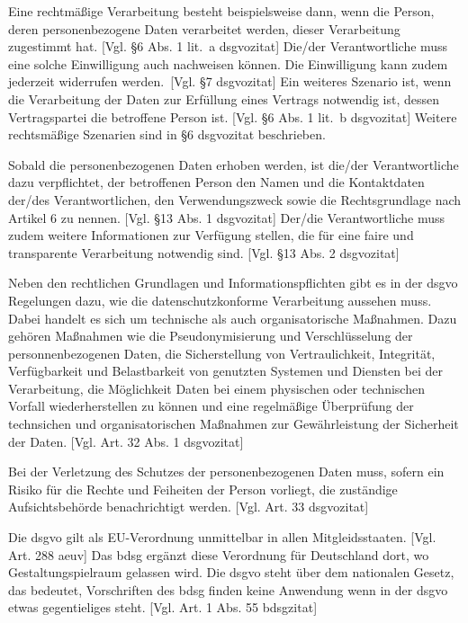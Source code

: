 Eine rechtmäßige Verarbeitung besteht beispielsweise dann, wenn die Person, deren personenbezogene Daten verarbeitet werden, dieser Verarbeitung zugestimmt hat. [Vgl. §6 Abs. 1 lit.~a \gls{dsgvozitat}] Die/der Verantwortliche muss eine solche Einwilligung auch nachweisen können. Die Einwilligung kann zudem jederzeit widerrufen werden.~[Vgl. §7 \gls{dsgvozitat}] Ein weiteres Szenario ist, wenn die Verarbeitung der Daten zur Erfüllung eines Vertrags notwendig ist, dessen Vertragspartei die betroffene Person ist. [Vgl. §6 Abs. 1 lit.~b \gls{dsgvozitat}] Weitere rechtsmäßige Szenarien sind in §6 \gls{dsgvozitat} beschrieben.  

Sobald die personenbezogenen Daten erhoben werden, ist die/der Verantwortliche dazu verpflichtet, der betroffenen Person den Namen und die Kontaktdaten der/des Verantwortlichen, den Verwendungszweck sowie die Rechtsgrundlage nach Artikel 6 zu nennen. [Vgl. §13 Abs. 1 \gls{dsgvozitat}] Der/die Verantwortliche muss zudem weitere Informationen zur Verfügung stellen, die für eine faire und transparente Verarbeitung notwendig sind. [Vgl. §13 Abs. 2 \gls{dsgvozitat}]

Neben den rechtlichen Grundlagen und Informationspflichten gibt es in der \gls{dsgvo} Regelungen dazu, wie die datenschutzkonforme Verarbeitung aussehen muss. Dabei handelt es sich um technische als auch organisatorische Maßnahmen. Dazu gehören Maßnahmen wie die Pseudonymisierung und Verschlüsselung der personnenbezogenen Daten, die Sicherstellung von Vertraulichkeit, Integrität, Verfügbarkeit und Belastbarkeit von genutzten Systemen und Diensten bei der Verarbeitung, die Möglichkeit Daten bei einem physischen oder technischen Vorfall wiederherstellen zu können und eine regelmäßige Überprüfung der technsichen und organisatorischen Maßnahmen zur Gewährleistung der Sicherheit der Daten. [Vgl. Art. 32 Abs. 1 \gls{dsgvozitat}]

Bei der Verletzung des Schutzes der personenbezogenen Daten muss, sofern ein Risiko für die Rechte und Feiheiten der Person vorliegt, die zuständige Aufsichtsbehörde benachrichtigt werden. [Vgl. Art. 33 \gls{dsgvozitat}]

Die \gls{dsgvo} gilt als EU-Verordnung unmittelbar in allen Mitgleidsstaaten. [Vgl. Art. 288 \gls{aeuv}] Das \gls{bdsg} ergänzt diese Verordnung für Deutschland dort, wo Gestaltungspielraum gelassen wird. Die \gls{dsgvo} steht über dem nationalen Gesetz, das bedeutet, Vorschriften des \gls{bdsg} finden keine Anwendung wenn in der \gls{dsgvo} etwas gegentieliges steht. [Vgl. Art. 1 Abs. 55 \gls{bdsgzitat}]

